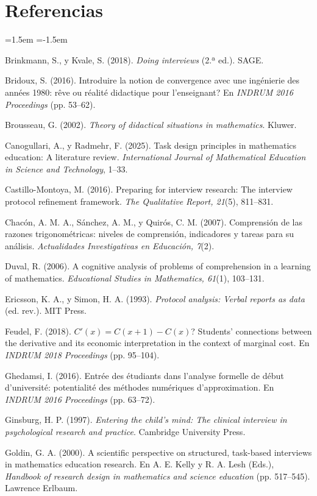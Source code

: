 \documentclass[11pt,letterpaper]{article}
\begin{document}
\section*{Referencias}
\begin{list}{}{\leftmargin=1.5em \itemindent=-1.5em \itemsep=3pt \parsep=0pt}\small
\item Brinkmann, S., y Kvale, S. (2018). \emph{Doing interviews} (2.ª ed.). SAGE.
\item Bridoux, S. (2016). Introduire la notion de convergence avec une ingénierie des années 1980: rêve ou réalité didactique pour l'enseignant? En \emph{INDRUM 2016 Proceedings} (pp. 53--62).
\item Brousseau, G. (2002). \emph{Theory of didactical situations in mathematics}. Kluwer.
\item Canogullari, A., y Radmehr, F. (2025). Task design principles in mathematics education: A literature review. \emph{International Journal of Mathematical Education in Science and Technology}, 1--33.
\item Castillo-Montoya, M. (2016). Preparing for interview research: The interview protocol refinement framework. \emph{The Qualitative Report, 21}(5), 811--831.
\item Chacón, A. M. A., Sánchez, A. M., y Quirós, C. M. (2007). Comprensión de las razones trigonométricas: niveles de comprensión, indicadores y tareas para su análisis. \emph{Actualidades Investigativas en Educación, 7}(2).
\item Duval, R. (2006). A cognitive analysis of problems of comprehension in a learning of mathematics. \emph{Educational Studies in Mathematics, 61}(1), 103--131.
\item Ericsson, K. A., y Simon, H. A. (1993). \emph{Protocol analysis: Verbal reports as data} (ed. rev.). MIT Press.
\item Feudel, F. (2018). $C'(x) = C(x+1) - C(x)$? Students' connections between the derivative and its economic interpretation in the context of marginal cost. En \emph{INDRUM 2018 Proceedings} (pp. 95--104).
\item Ghedamsi, I. (2016). Entrée des étudiants dans l'analyse formelle de début d'université: potentialité des méthodes numériques d'approximation. En \emph{INDRUM 2016 Proceedings} (pp. 63--72).
\item Ginsburg, H. P. (1997). \emph{Entering the child's mind: The clinical interview in psychological research and practice}. Cambridge University Press.
\item Goldin, G. A. (2000). A scientific perspective on structured, task-based interviews in mathematics education research. En A. E. Kelly y R. A. Lesh (Eds.), \emph{Handbook of research design in mathematics and science education} (pp. 517--545). Lawrence Erlbaum.

\end{list}
\end{document}
